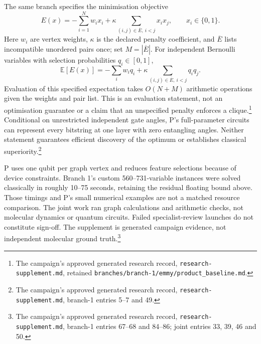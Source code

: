 \documentclass{article}
\newcommand{\rr}[1]{\footnote{The campaign's approved generated research record, \texttt{research-supplement.md}, #1.}}
\begin{document}
The same branch specifies the minimisation objective
\[
 E(x)=-\sum_{i=1}^N w_i x_i+\kappa\sum_{(i,j)\in\overline E,\ i<j}x_ix_j,\qquad x_i\in\{0,1\}.
\]
Here \(w_i\) are vertex weights, \(\kappa\) is the declared penalty coefficient, and \(\overline E\) lists incompatible unordered pairs once; set \(M=|\overline E|\). For independent Bernoulli variables with selection probabilities \(q_i\in[0,1]\),
\[
 \mathbb E[E(x)]=-\sum_iw_iq_i+\kappa\sum_{(i,j)\in\overline E,\ i<j}q_iq_j.
\]
Evaluation of this specified expectation takes \(O(N+M)\) arithmetic operations given the weights and pair list. This is an evaluation statement, not an optimisation guarantee or a claim that an unspecified penalty enforces a clique.\rr{retained \texttt{branches/branch-1/emmy/product\_baseline.md}} Conditional on unrestricted independent gate angles, P's full-parameter circuits can represent every bitstring at one layer with zero entangling angles. Neither statement guarantees efficient discovery of the optimum or establishes classical superiority.\cite{P}\rr{branch-1 entries 5--7 and 49}

P uses one qubit per graph vertex and reduces feature selections because of device constraints.\cite{P} Branch 1's custom 560--731-variable instances were solved classically in roughly 10--75 seconds, retaining the residual floating bound above. Those timings and P's small numerical examples are not a matched resource comparison. The joint work ran graph calculations and arithmetic checks, not molecular dynamics or quantum circuits. Failed specialist-review launches do not constitute sign-off. The supplement is generated campaign evidence, not independent molecular ground truth.\rr{branch-1 entries 67--68 and 84--86; joint entries 33, 39, 46 and 50}



\end{document}
